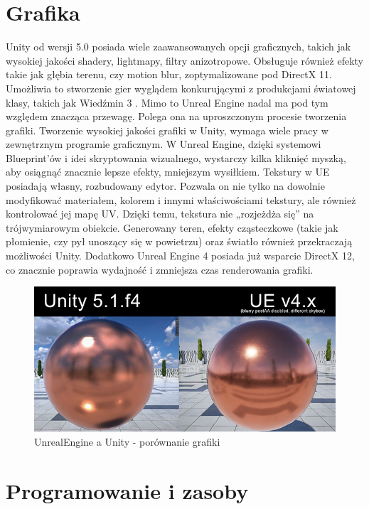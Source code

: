\documentclass[brudnopis]{xmgr}
\begin{document}
\section{Grafika}

Unity od wersji 5.0 posiada wiele zaawansowanych opcji graficznych, takich jak wysokiej jakości shadery, lightmapy, filtry anizotropowe. Obsługuje również efekty takie jak głębia terenu, czy motion blur, zoptymalizowane pod DirectX 11. Umożliwia to stworzenie gier wyglądem konkurującymi z produkcjami światowej klasy, takich jak Wiedźmin 3 .
Mimo to Unreal Engine nadal ma pod tym względem znacząca przewagę. Polega ona na uproszczonym procesie tworzenia grafiki. Tworzenie wysokiej jakości grafiki w Unity, wymaga wiele pracy w zewnętrznym programie graficznym. W Unreal Engine, dzięki systemowi Blueprint’ów i idei skryptowania wizualnego, wystarczy kilka kliknięć myszką, aby osiągnąć znacznie lepsze efekty, mniejszym wysiłkiem. Tekstury w UE posiadają własny, rozbudowany edytor. Pozwala on nie tylko na dowolnie modyfikować materiałem, kolorem i innymi właściwościami tekstury, ale również kontrolować jej mapę UV. Dzięki temu, tekstura nie „rozjeżdża się” na trójwymiarowym obiekcie. Generowany teren, efekty cząsteczkowe (takie jak płomienie, czy pył unoszący się w powietrzu) oraz światło również przekraczają możliwości Unity. Dodatkowo Unreal Engine 4 posiada już wsparcie DirectX 12, co znacznie poprawia wydajność i zmniejsza czas renderowania grafiki.

\begin{figure}[!htb]
    \begin{center}
    \includegraphics[scale=0.5]{Screeny/UE_vs_Unity}
    \end{center}
    \caption{UnrealEngine a Unity - porównanie grafiki}
\end{figure}

\section{Programowanie i zasoby}
\end{document}
